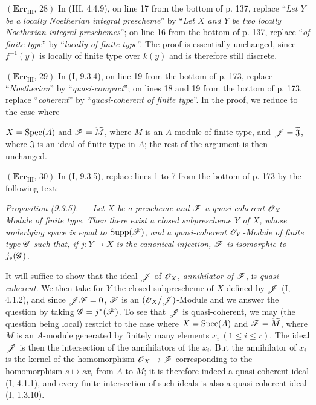 \noindent\textbf{$(\mathbf{Err}_{\mathrm{III}},\,28)$} In (III, 4.4.9), on
line 17 from the bottom of p. 137, replace ``\emph{Let $Y$ be a locally
Noetherian integral prescheme}'' by ``\emph{Let $X$ and $Y$ be two locally
Noetherian integral preschemes}''; on line 16 from the bottom of p. 137,
replace ``\emph{of finite type}'' by ``\emph{locally of finite type}''. The
proof is essentially unchanged, since $f^{-1}(y)$ is locally of finite type
over $k(y)$ and is therefore still discrete.

\noindent\textbf{$(\mathbf{Err}_{\mathrm{III}},\,29)$} In (I, 9.3.4), on line
19 from the bottom of p. 173, replace ``\emph{Noetherian}'' by
``\emph{quasi-compact}''; on lines 18 and 19 from the bottom of p. 173,
replace ``\emph{coherent}'' by ``\emph{quasi-coherent of finite type}''. In
the proof, we reduce to the case where

$X=\operatorname{Spec}(A)$ and $\mathscr{F}=\widetilde M$, where $M$ is an $A$-module of finite
type, and $\mathscr{J}=\widetilde{\mathfrak J}$, where $\mathfrak J$ is an ideal of
finite type in $A$; the rest of the argument is then unchanged.

\noindent\textbf{$(\mathbf{Err}_{\mathrm{III}},\,30)$} In (I, 9.3.5),
replace lines 1 to 7 from the bottom of p. 173 by the following text:

\emph{Proposition (9.3.5). --- Let $X$ be a prescheme and $\mathscr{F}$ a
quasi-coherent $\mathscr{O}_X$-Module of finite type. Then there exist a closed
subprescheme $Y$ of $X$, whose underlying space is equal to
$\operatorname{Supp}(\mathscr{F})$, and a quasi-coherent $\mathscr{O}_Y$-Module of
finite type $\mathscr{G}$ such that, if $j:Y\to X$ is the canonical injection,
$\mathscr{F}$ is isomorphic to $j_*(\mathscr{G})$.}

It will suffice to show that the ideal $\mathscr{J}$ of $\mathscr{O}_X$,
\emph{annihilator of $\mathscr{F}$}, is \emph{quasi-coherent}. We then take for $Y$
the closed subprescheme of $X$ defined by $\mathscr{J}$ (I, 4.1.2), and since
$\mathscr{J}\mathscr{F}=0$, $\mathscr{F}$ is an $(\mathscr{O}_X/\mathscr{J})$-Module and we answer the
question by taking $\mathscr{G}=j^*(\mathscr{F})$. To see that $\mathscr{J}$ is
quasi-coherent, we may (the question being local) restrict to the case where
$X=\operatorname{Spec}(A)$ and $\mathscr{F}=\widetilde M$, where $M$ is an $A$-module generated
by finitely many elements $x_i\ (1\leq i\leq r)$. The ideal $\mathscr{J}$ is then
the intersection of the annihilators of the $x_i$. But the annihilator of
$x_i$ is the kernel of the homomorphism $\mathscr{O}_X\to\mathscr{F}$ corresponding to
the homomorphism $s\mapsto sx_i$ from $A$ to $M$; it is therefore indeed a
quasi-coherent ideal (I, 4.1.1), and every finite intersection of such ideals
is also a quasi-coherent ideal (I, 1.3.10).

